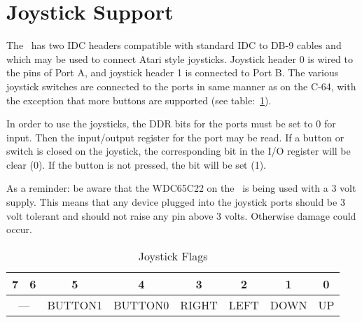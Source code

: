 \section{Joystick Support}

The \jr\ has two IDC headers compatible with standard IDC to DB-9 cables and which may be used to connect Atari style joysticks. Joystick header 0 is wired to the pins of Port A, and joystick header 1 is connected to Port B. The various joystick switches are connected to the ports in same manner as on the C-64, with the exception that more buttons are supported (see table:~\ref{tab:via_joystick}).

In order to use the joysticks, the DDR bits for the ports must be set to 0 for input. Then the input/output register for the port may be read. If a button or switch is closed on the joystick, the corresponding bit in the I/O register will be clear (0). If the button is not pressed, the bit will be set (1).

As a reminder: be aware that the WDC65C22 on the \jr\ is being used with a 3 volt supply. This means that any device plugged into the joystick ports should be 3 volt tolerant and should not raise any pin above 3 volts. Otherwise damage could occur.

\begin{table}[h]
    \begin{center}
        \begin{tabular}{|c|c|c|c|c|c|c|c|} \hline
            7 & 6 & 5 & 4 & 3 & 2 & 1 & 0 \\\hline
            \multicolumn{2}{|c|}{---} & BUTTON1 & BUTTON0 & RIGHT & LEFT & DOWN & UP \\ \hline
        \end{tabular}
    \end{center}
    \caption{Joystick Flags}
    \label{tab:via_joystick}
\end{table}
